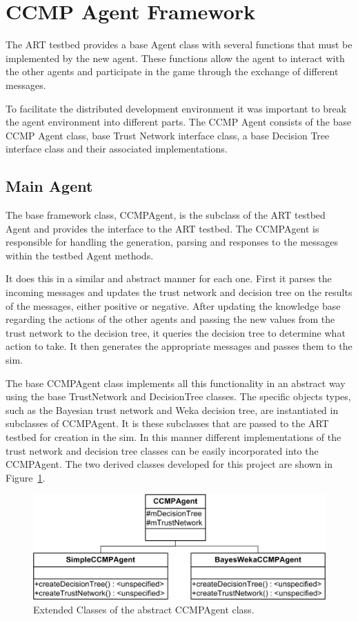 \section{CCMP Agent Framework}
The ART testbed provides a base Agent class with several functions that must be
implemented by the new agent. These functions allow the agent to interact with
the other agents and participate in the game through the exchange of different
messages.  

To facilitate the distributed development environment it was important to break
the agent environment into different parts.  The CCMP Agent consists of the
base CCMP Agent class, base Trust Network interface class, a base Decision
Tree interface class and their associated implementations.

\subsection{Main Agent}
The base framework class, CCMPAgent, is the subclass of the ART testbed Agent
and provides the interface to the ART testbed.  The CCMPAgent is
responsible for handling the generation, parsing and responses to the
messages within the testbed Agent methods.  

It does this in a similar and abstract manner for each one. First it parses the
incoming messages and updates the trust network and decision tree on the
results of the messages, either positive or negative.  After updating the
knowledge base regarding the actions of the other agents and passing the new
values from the trust network to the decision tree, it queries the decision tree
to determine what action to take.  It then generates the appropriate
messages and passes them to the sim.

The base CCMPAgent class implements all this functionality in an abstract way
using the base TrustNetwork and DecisionTree classes.  The specific objects
types, such as the Bayesian trust network and Weka decision tree, are
instantiated in subclasses of CCMPAgent.  It is these subclasses that are passed
to the ART testbed for creation in the sim.  In this manner different
implementations of the trust network and decision tree classes can be easily
incorporated into the CCMPAgent.  The two derived classes developed for this 
project are shown in Figure~\ref{fig:CCMPClasses}.

\begin{figure}
\centering
\includegraphics{images/ccmpclasses.jpg}
\caption{Extended Classes of the abstract CCMPAgent class.}
\label{fig:CCMPClasses}
\end{figure}

